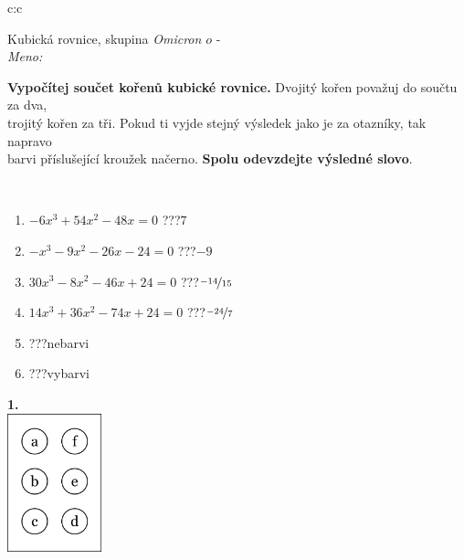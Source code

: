 \documentclass[10pt]{report}
\newcommand\omicron{o}
\begin{document}
\begin{tabular}{c:c}
\begin{minipage}[c][104.5mm][t]{0.5\linewidth}
\begin{center}
\vspace{7mm}
{\huge Kubická rovnice, skupina \textit{Omicron $\omicron$} -}\\[5mm]
\textit{Meno:}\phantom{xxxxxxxxxxxxxxxxxxxxxxxxxxxxxxxxxxxxxxxxxxxxxxxxxxxxxxxxxxxxxxxxx}\\[5mm]
\begin{minipage}{0.95\linewidth}
\textbf{Vypočítej součet kořenů kubické rovnice.} Dvojitý kořen považuj do součtu za dva,\\trojitý kořen za tři. Pokud ti vyjde stejný výsledek jako je za otazníky, tak napravo\\barvi příslušející kroužek načerno. \textbf{Spolu odevzdejte výsledné slovo}.
\end{minipage}
\\[1mm]
\begin{minipage}{0.79\linewidth}
\begin{center}
\begin{varwidth}{\linewidth}
\begin{enumerate}
\Large
\item $-6x^3+54x^2-48x=0$\quad \dotfill\; ???\;\dotfill \quad $7$
\item $-x^3-9x^2-26x-24=0$\quad \dotfill\; ???\;\dotfill \quad $-9$
\item $30x^3-8x^2-46x+24=0$\quad \dotfill\; ???\;\dotfill \quad $\nicefrac{-14}{15}$
\item $14x^3+36x^2-74x+24=0$\quad \dotfill\; ???\;\dotfill \quad $\nicefrac{-24}{7}$
\item \quad \dotfill\; ???\;\dotfill \quad nebarvi
\item \quad \dotfill\; ???\;\dotfill \quad vybarvi
\end{enumerate}
\end{varwidth}
\end{center}
\end{minipage}
\begin{minipage}{0.20\linewidth}
\begin{center}
{\Huge\bfseries 1.} \\[2mm]
\includegraphics[height=40mm]{../images/braille.png}

\end{center}
\end{minipage}
\end{center}
\end{minipage}
\end{tabular}
\end{document}
